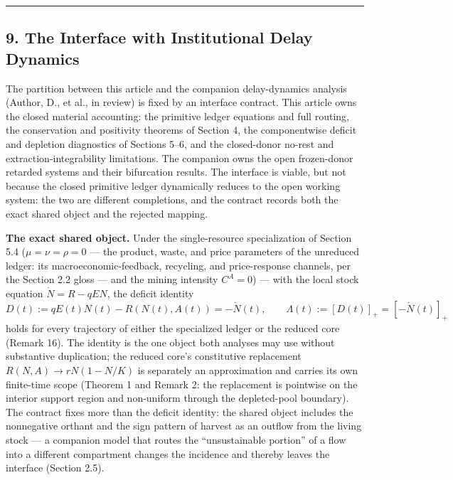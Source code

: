 \documentclass[11pt]{article}
\begin{document}
\begin{center}\rule{0.5\linewidth}{0.5pt}\end{center}

\subsection{9. The Interface with Institutional Delay
Dynamics}\label{the-interface-with-institutional-delay-dynamics}

The partition between this article and the companion delay-dynamics
analysis (Author, D., et al., in review) is fixed by an interface
contract. This article owns the closed material accounting: the
primitive ledger equations and full routing, the conservation and
positivity theorems of Section 4, the componentwise deficit and
depletion diagnostics of Sections 5--6, and the closed-donor no-rest and
extraction-integrability limitations. The companion owns the open
frozen-donor retarded systems and their bifurcation results. The
interface is viable, but not because the closed primitive ledger
dynamically reduces to the open working system: the two are different
completions, and the contract records both the exact shared object and
the rejected mapping.

\textbf{The exact shared object.} Under the single-resource
specialization of Section 5.4 (\(\mu = \nu = \rho = 0\) --- the product,
waste, and price parameters of the unreduced ledger: its
macroeconomic-feedback, recycling, and price-response channels, per the
Section 2.2 gloss --- and the mining intensity \(C^A = 0\)) --- with the
local stock equation \(\dot N = R - qEN\), the deficit identity
\[D(t) := qE(t)N(t) - R(N(t), A(t)) = -\dot N(t), \qquad \Lambda(t) := [D(t)]_+ = [-\dot N(t)]_+\]
holds for every trajectory of either the specialized ledger or the
reduced core (Remark 16). The identity is the one object both analyses
may use without substantive duplication; the reduced core's constitutive
replacement \(R(N,A) \to rN(1 - N/K)\) is separately an approximation
and carries its own finite-time scope (Theorem 1 and Remark 2: the
replacement is pointwise on the interior support region and non-uniform
through the depleted-pool boundary). The contract fixes more than the
deficit identity: the shared object includes the nonnegative orthant and
the sign pattern of harvest as an outflow from the living stock --- a
companion model that routes the ``unsustainable portion'' of a flow into
a different compartment changes the incidence and thereby leaves the
interface (Section 2.5).
\end{document}

